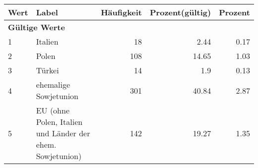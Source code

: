      \begin{longtable}{lXrrr}
     \toprule
     \textbf{Wert} & \textbf{Label} & \textbf{Häufigkeit} & \textbf{Prozent(gültig)} & \textbf{Prozent} \\
     \endhead
     \midrule
     \multicolumn{5}{l}{\textbf{Gültige Werte}}\\

     1 &
     \multicolumn{1}{X}{ Italien   } &


       \num{18} &
       \num[round-mode=places,round-precision=2]{2.44} &
         \num[round-mode=places,round-precision=2]{0.17} \\

     2 &
     \multicolumn{1}{X}{ Polen   } &


       \num{108} &
       \num[round-mode=places,round-precision=2]{14.65} &
         \num[round-mode=places,round-precision=2]{1.03} \\

     3 &
     \multicolumn{1}{X}{ Türkei   } &


       \num{14} &
       \num[round-mode=places,round-precision=2]{1.9} &
         \num[round-mode=places,round-precision=2]{0.13} \\

     4 &
     \multicolumn{1}{X}{ ehemalige Sowjetunion   } &


       \num{301} &
       \num[round-mode=places,round-precision=2]{40.84} &
         \num[round-mode=places,round-precision=2]{2.87} \\

     5 &
     \multicolumn{1}{X}{ EU (ohne Polen, Italien und Länder der ehem. Sowjetunion)   } &


       \num{142} &
       \num[round-mode=places,round-precision=2]{19.27} &
         \num[round-mode=places,round-precision=2]{1.35} \\


\end{longtable}

